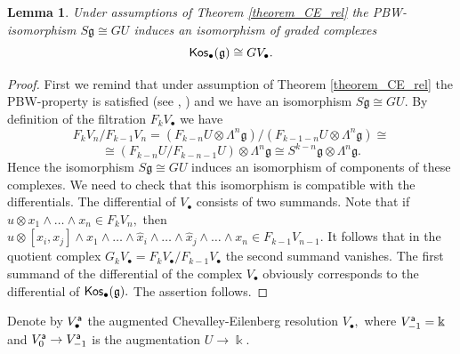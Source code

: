 \documentclass{amsart}
\numberwithin{equation}{section}
\newtheorem{lemma}[theorem]{Lemma}
\theoremstyle{definition}
\def\gg{\mathfrak{g}}
\def\kk{\Bbbk}
\begin{document}
\begin{lemma}\label{lemma_kos_GV_iso} Under assumptions of Theorem \ref{theorem_CE_rel} the PBW-isomorphism $S \gg \cong GU$ induces an isomorphism of graded complexes 
$${\sf Kos}_\bullet(\gg)\cong GV_\bullet.
$$ 
\end{lemma}
\begin{proof} First we remind that under assumption of Theorem \ref{theorem_CE_rel} the PBW-property is satisfied (see \cite[Th. 5.9]{grinberg2011poincare}, \cite{higgins1969baer}) and we have an isomorphism $S\gg\cong GU$.  By definition of the filtration $F_kV_\bullet$ we have 
$$F_kV_n/F_{k-1}V_n=(F_{k-n}U\otimes \Lambda^n\gg)/(F_{k-1-n} U \otimes \Lambda^n\gg)\cong $$
$$\cong (F_{k-n}U/F_{k-n-1}U) \otimes \Lambda^n\gg\cong S^{k-n}\gg \otimes \Lambda^n\gg.$$ 
Hence the isomorphism $S \gg \cong GU$ induces an isomorphism of components of these complexes. We need to check that this isomorphism is compatible with the differentials. The differential of $V_\bullet$ consists of two summands. Note that if $u\otimes x_1\wedge \dots \wedge x_n \in F_kV_n,$ then $u\otimes [x_i,x_j]\wedge x_1\wedge \dots \wedge \hat x_i \wedge \dots \wedge \hat x_j \wedge \dots \wedge x_n\in F_{k-1} V_{n-1}.$ It follows that in the quotient complex $G_kV_\bullet=F_kV_\bullet/F_{k-1}V_\bullet$ the second summand vanishes. The first summand of the differential of the complex $V_\bullet$ obviously corresponds to the differential of ${\sf Kos}_\bullet(\gg).$ The assertion follows. 
\end{proof}






Denote by $V^{\sf a}_\bullet$ the augmented Chevalley-Eilenberg resolution $V_\bullet,$ where  $V^{\sf a}_{-1}=\kk$ and $V^{\sf a}_0\to V^{\sf a}_{-1}$ is the augmentation $U\to \kk.$ 
\end{document}
